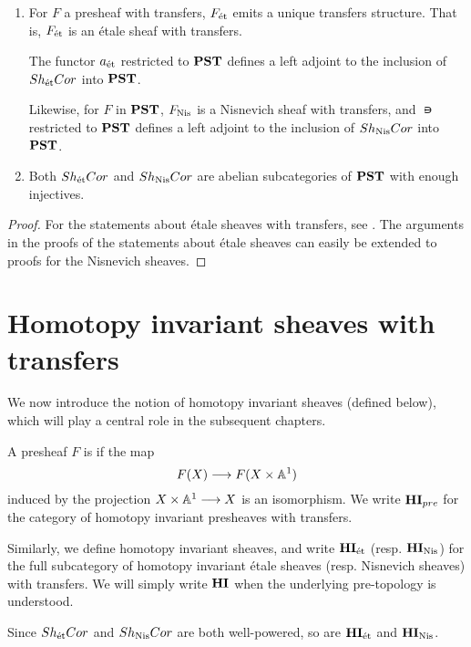 \begin{prop}\label{prop_et_and_nis_sheafification}
\begin{enumerate}
\item For $F$ a presheaf with transfers, $F_{\mathrm{\acute{e}t}}$ emits a 
unique transfers structure. That is, $F_{\mathrm{\acute{e}t}}$ is an \'etale 
sheaf with transfers.

The functor $a_{\mathrm{\acute{e}t}}$ restricted to $\mathbf{PST}$ defines a left adjoint
to the inclusion of $Sh_{\mathrm{\acute{e}t}}Cor$ into $\mathbf{PST}$. 

Likewise, for $F$ in $\mathbf{PST}$, $F_{\mathrm{Nis}}$ is a Nisnevich sheaf with
transfers, and $\nis$ restricted to $\mathbf{PST}$ defines a left adjoint 
to the inclusion of $Sh_{\mathrm{Nis}}Cor$ into $\mathbf{PST}$. 

\item Both $Sh_{\mathrm{\acute{e}t}}Cor$ and $Sh_{\mathrm{Nis}}Cor$ are abelian 
subcategories of $\mathbf{PST}$ with enough injectives.
\end{enumerate}
\end{prop}
\begin{proof}
For the statements about \'etale sheaves with transfers, see 
\cite[6.17, 6.18 and 6.19]{MVW}. The arguments in the proofs of the
statements about \'etale sheaves can easily be extended to proofs
for the Nisnevich sheaves.
\end{proof}

\section{Homotopy invariant sheaves with transfers}

We now introduce the notion of homotopy invariant sheaves (defined
below), which will play a central role in the subsequent chapters.

\begin{defn}
A presheaf $F$ is  if the map 
\[
F(X) \longrightarrow F(X \times \mathbb{A}^1)
\]
induced by the projection $X \times \mathbb{A}^1 \longrightarrow X$ is an isomorphism.
We write $\mathbf{HI}_{pre}$ for the category of homotopy invariant 
presheaves with transfers.

Similarly, we define homotopy invariant sheaves, and write $\mathbf{HI}_{\mathrm{\acute{e}t}}$ 
(resp. $\mathbf{HI}_{\mathrm{Nis}}$) for the full subcategory of homotopy invariant 
\'etale sheaves (resp. Nisnevich sheaves) with transfers. We will 
simply write $\mathbf{HI}$ when the underlying pre-topology is understood.

Since $Sh_{\mathrm{\acute{e}t}}Cor$ and $Sh_{\mathrm{Nis}}Cor$ are both well-powered, so are 
$\mathbf{HI}_{\mathrm{\acute{e}t}}$ and $\mathbf{HI}_{\mathrm{Nis}}$.
\end{defn}

